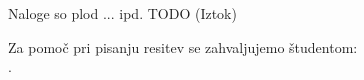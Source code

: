 \thispagestyle{empty}
\cleardoublepage
{}
\vspace*{3cm}
\begin{center}
Naloge so plod ... ipd. TODO (Iztok)
\end{center}

\medskip

\begin{center}
    Za pomo\v c pri pisanju resitev se zahvaljujemo \v studentom: \\
		\myStudents.
\end{center}